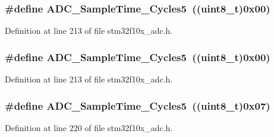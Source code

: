 \subsubsection[{\texorpdfstring{A\+D\+C\+\_\+\+Sample\+Time\+\_\+1\+Cycles5}{ADC_SampleTime_1Cycles5}}]{\setlength{\rightskip}{0pt plus 5cm}\#define A\+D\+C\+\_\+\+Sample\+Time\+\_\+Cycles5~(({\bf uint8\+\_\+t})0x00)}\hypertarget{group___a_d_c__sampling__time_gad085065e48857ada890863a7db575c6e}{}\label{group___a_d_c__sampling__time_gad085065e48857ada890863a7db575c6e}


Definition at line 213 of file stm32f10x\+\_\+adc.\+h.

\subsubsection[{\texorpdfstring{A\+D\+C\+\_\+\+Sample\+Time\+\_\+1\+Cycles5}{ADC_SampleTime_1Cycles5}}]{\setlength{\rightskip}{0pt plus 5cm}\#define A\+D\+C\+\_\+\+Sample\+Time\+\_\+Cycles5~(({\bf uint8\+\_\+t})0x00)}\hypertarget{group___a_d_c__sampling__time_gad085065e48857ada890863a7db575c6e}{}\label{group___a_d_c__sampling__time_gad085065e48857ada890863a7db575c6e}


Definition at line 213 of file stm32f10x\+\_\+adc.\+h.

\subsubsection[{\texorpdfstring{A\+D\+C\+\_\+\+Sample\+Time\+\_\+239\+Cycles5}{ADC_SampleTime_239Cycles5}}]{\setlength{\rightskip}{0pt plus 5cm}\#define A\+D\+C\+\_\+\+Sample\+Time\+\_\+Cycles5~(({\bf uint8\+\_\+t})0x07)}\hypertarget{group___a_d_c__sampling__time_ga93117dc4090dc4e3e84e0eef6d6ab073}{}\label{group___a_d_c__sampling__time_ga93117dc4090dc4e3e84e0eef6d6ab073}


Definition at line 220 of file stm32f10x\+\_\+adc.\+h.

